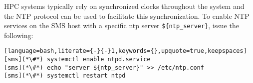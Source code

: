 HPC systems typically rely on synchronized clocks throughout the system and the
NTP protocol can be used to facilitate this synchronization.  To enable NTP
services on the SMS host with a specific ntp server \texttt{\$\{ntp\_server\}},
issue the following:

\begin{lstlisting}[language=bash,literate={-}{-}1,keywords={},upquote=true,keepspaces]
[sms](*\#*) systemctl enable ntpd.service
[sms](*\#*) echo "server ${ntp_server}" >> /etc/ntp.conf
[sms](*\#*) systemctl restart ntpd
\end{lstlisting}
